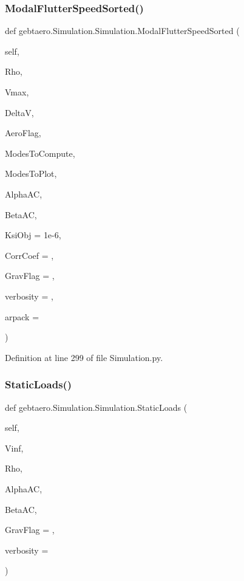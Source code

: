 \subsubsection{\texorpdfstring{Modal\+Flutter\+Speed\+Sorted()}{ModalFlutterSpeedSorted()}}
{\footnotesize\ttfamily def gebtaero.\+Simulation.\+Simulation.\+Modal\+Flutter\+Speed\+Sorted (\begin{DoxyParamCaption}\item[{}]{self,  }\item[{}]{Rho,  }\item[{}]{Vmax,  }\item[{}]{DeltaV,  }\item[{}]{Aero\+Flag,  }\item[{}]{Modes\+To\+Compute,  }\item[{}]{Modes\+To\+Plot,  }\item[{}]{Alpha\+AC,  }\item[{}]{Beta\+AC,  }\item[{}]{Ksi\+Obj = {\ttfamily 1e-\/6},  }\item[{}]{Corr\+Coef = {},  }\item[{}]{Grav\+Flag = {},  }\item[{}]{verbosity = {},  }\item[{}]{arpack = {} }\end{DoxyParamCaption})}



Definition at line 299 of file Simulation.\+py.

\mbox{\label{classgebtaero_1_1_simulation_1_1_simulation_a36da2334a6e743a9ab29bdfe1334ed04}} 
\subsubsection{\texorpdfstring{Static\+Loads()}{StaticLoads()}}
{\footnotesize\ttfamily def gebtaero.\+Simulation.\+Simulation.\+Static\+Loads (\begin{DoxyParamCaption}\item[{}]{self,  }\item[{}]{Vinf,  }\item[{}]{Rho,  }\item[{}]{Alpha\+AC,  }\item[{}]{Beta\+AC,  }\item[{}]{Grav\+Flag = {},  }\item[{}]{verbosity = {} }\end{DoxyParamCaption})}




